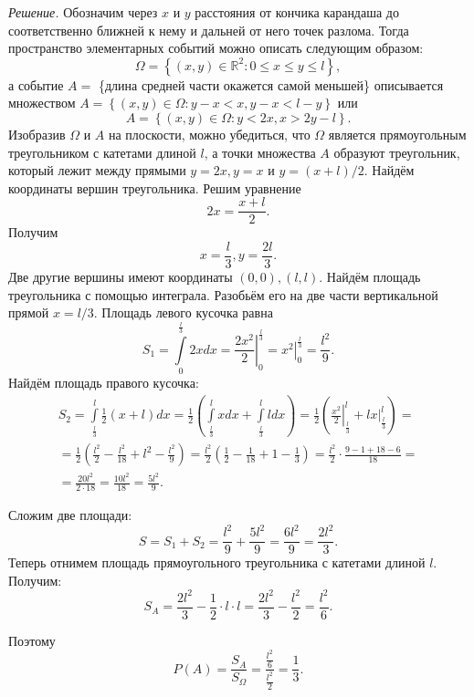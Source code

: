 \textit{Решение.} Обозначим через $x$ и $y$ расстояния от кончика карандаша до соответственно ближней к нему и дальней от него точек разлома.
Тогда пространство элементарных событий можно описать следующим образом:
$$ \Omega =
\left\{ \left( x, y \right) \in \mathbb{R}^2:
0 \leq x \leq y \leq l \right\},$$
а событие $A =$
\{длина средней части окажется самой меньшей\} описывается множеством $A = \left\{ \left( x, y \right) \in \Omega: y - x < x, y - x < l - y \right\} $ или
$$A =
\left\{ \left( x, y \right) \in \Omega:
y < 2x,
x > 2y - l \right\}.$$ 
Изобразив $ \Omega $ и $A$ на плоскости,
можно убедиться,
что $ \Omega $ является прямоугольным треугольником с катетами длиной $l$,
а точки множества $A$ образуют треугольник, который лежит между прямыми $y = 2x, y = x$ и $y = \left( x+l \right) /2$.
Найдём координаты вершин треугольника.
Решим уравнение
$$2x = \frac{x+l}{2}.$$
Получим
$$x = \frac{l}{3}, y = \frac{2l}{3}.$$
Две другие вершины имеют координаты $ \left( 0, 0 \right), \left( l, l \right)$.
Найдём площадь треугольника с помощью интеграла.
Разобьём его на две части вертикальной прямой $x = l/3$.
Площадь левого кусочка равна 
$$S_1 =
\int \limits_{0}^{ \frac{l}{3} } 2 x dx =
\left. \frac{2x^2}{2} \right|_0^{ \frac{l}{3} } =
\left. x^2 \right|_0^{ \frac{l}{3} } =
\frac{l^2}{9}.$$
Найдём площадь правого кусочка:
\begin{equation*}
\begin{split}
S_2 =
\int \limits_{ \frac{l}{3} }^l \frac{1}{2} \left( x+l \right) dx =
\frac{1}{2} \left( \int \limits_{ \frac{l}{3} }^l x dx + \int \limits_{ \frac{l}{3} }^l l dx \right) =
\frac{1}{2} \left( \left. \frac{x^2}{2} \right|_{ \frac{l}{3} }^l + \left. lx \right|_{ \frac{l}{3} }^l \right) = \\
= \frac{1}{2} \left( \frac{l^2}{2} - \frac{l^2}{18} + l^2 - \frac{l^2}{9} \right) =
\frac{l^2}{2} \left( \frac{1}{2} - \frac{1}{18} + 1 - \frac{1}{3} \right) =
\frac{l^2}{2} \cdot \frac{9-1+18-6}{18} = \\
= \frac{20 l^2}{2 \cdot 18} =
\frac{10 l^2}{18} =
\frac{5 l^2}{9}.
\end{split}
\end{equation*}

Сложим две площади:
$$S =
S_1 + S_2 = 
\frac{l^2}{9} + \frac{5 l^2}{9} =
\frac{6 l^2}{9} =
\frac{2 l^2}{3}.$$
Теперь отнимем площадь прямоугольного треугольника с катетами длиной $l$.
Получим:
$$S_A =
\frac{2 l^2}{3} - \frac{1}{2} \cdot l \cdot l =
\frac{2 l^2}{3} - \frac{l^2}{2} =
\frac{l^2}{6}.$$

Поэтому
$$P \left( A \right) =
\frac{S_A}{S_{ \Omega }} =
\frac{ \frac{l^2}{6} }{ \frac{l^2}{2} } =
\frac{1}{3}.$$


